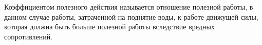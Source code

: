 Коэффициентом полезного действия называется отношение полезной работы,
в данном случае работы, затраченной на поднятие воды, к работе движущей
силы, которая должна быть больше полезной работы вследствие вредных
сопротивлений.
